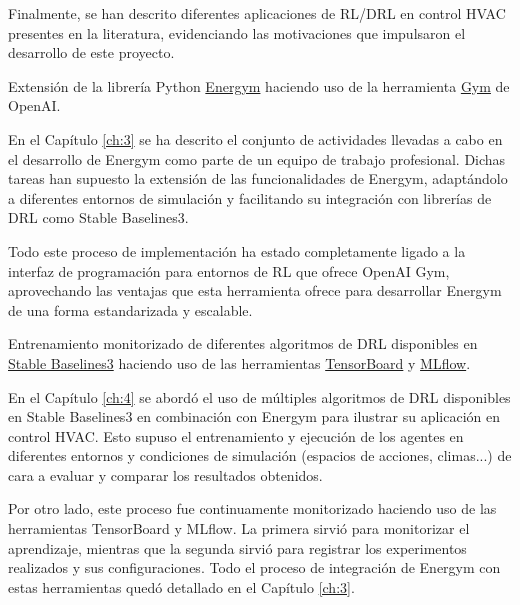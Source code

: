 Finalmente, se han descrito diferentes aplicaciones de RL/DRL en control HVAC presentes en la literatura, evidenciando las motivaciones que impulsaron el desarrollo de este proyecto.

\begin{tcolorbox}[colbacktitle=green!30!white, title=Subobjetivo 2, coltitle=black, fonttitle=\bfseries]
Extensión de la librería Python \href{https://github.com/jajimer/energym}{Energym} haciendo uso de la herramienta \href{https://gym.openai.com/}{Gym} de OpenAI.
\end{tcolorbox}

En el Capítulo \ref{ch:3} se ha descrito el conjunto de actividades llevadas a cabo en el desarrollo de Energym como parte de un equipo de trabajo profesional. Dichas tareas han supuesto la extensión de las funcionalidades de Energym, adaptándolo a diferentes entornos de simulación y facilitando su integración con librerías de DRL como Stable Baselines3.

Todo este proceso de implementación ha estado completamente ligado a la interfaz de programación para entornos de RL que ofrece OpenAI Gym, aprovechando las ventajas que esta herramienta ofrece para desarrollar Energym de una forma estandarizada y escalable.

\begin{tcolorbox}[colbacktitle=green!30!white, title=Subobjetivo 3, coltitle=black, fonttitle=\bfseries]
Entrenamiento monitorizado de diferentes algoritmos de DRL disponibles en \href{https://github.com/DLR-RM/stable-baselines3}{Stable Baselines3} haciendo uso de las herramientas \href{https://tensorflow.org/tensorboard}{TensorBoard} y \href{https://mlflow.org/}{MLflow}.
\end{tcolorbox}

En el Capítulo \ref{ch:4} se abordó el uso de múltiples algoritmos de DRL disponibles en Stable Baselines3 en combinación con Energym para ilustrar su aplicación en control HVAC. Esto supuso el entrenamiento y ejecución de los agentes en diferentes entornos y condiciones de simulación (espacios de acciones, climas...) de cara a evaluar y comparar los resultados obtenidos.

Por otro lado, este proceso fue continuamente monitorizado haciendo uso de las herramientas TensorBoard y MLflow. La primera sirvió para monitorizar el aprendizaje, mientras que la segunda sirvió para registrar los experimentos realizados y sus configuraciones. Todo el proceso de integración de Energym con estas herramientas quedó detallado en el Capítulo \ref{ch:3}.

